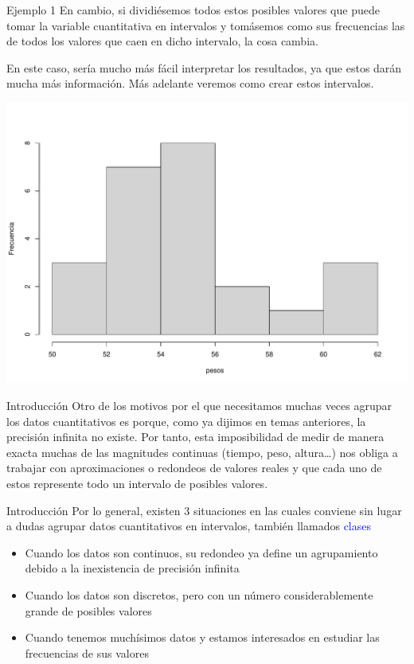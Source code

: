 \documentclass[
  ignorenonframetext,
]{beamer}
\providecommand{\tightlist}{%
  \setlength{\itemsep}{0pt}\setlength{\parskip}{0pt}}
\newcommand\blue[1]{\textcolor{blue}{#1}}
\begin{document}
\begin{frame}{Ejemplo 1}
\label{ejemplo-1-14}
En cambio, si dividiésemos todos estos posibles valores que puede tomar
la variable cuantitativa en intervalos y tomásemos como sus frecuencias
las de todos los valores que caen en dicho intervalo, la cosa cambia.

En este caso, sería mucho más fácil interpretar los resultados, ya que
estos darán mucha más información. Más adelante veremos como crear estos
intervalos.

\includegraphics[width=0.8\linewidth]{R_base_files/figure-beamer/unnamed-chunk-195-1}
\end{frame}

\begin{frame}{Introducción}
\label{introducciuxf3n-2}
Otro de los motivos por el que necesitamos muchas veces agrupar los
datos cuantitativos es porque, como ya dijimos en temas anteriores, la
precisión infinita no existe. Por tanto, esta imposibilidad de medir de
manera exacta muchas de las magnitudes continuas (tiempo, peso,
altura\ldots) nos obliga a trabajar con aproximaciones o redondeos de
valores reales y que cada uno de estos represente todo un intervalo de
posibles valores.
\end{frame}

\begin{frame}{Introducción}
\label{introducciuxf3n-3}
Por lo general, existen 3 situaciones en las cuales conviene sin lugar a
dudas agrupar datos cuantitativos en intervalos, también llamados
\blue{clases}

\begin{itemize}
\tightlist
\item
  Cuando los datos son continuos, su redondeo ya define un agrupamiento
  debido a la inexistencia de precisión infinita
\item
  Cuando los datos son discretos, pero con un número considerablemente
  grande de posibles valores
\item
  Cuando tenemos muchísimos datos y estamos interesados en estudiar las
  frecuencias de sus valores
\end{itemize}
\end{frame}
\end{document}
